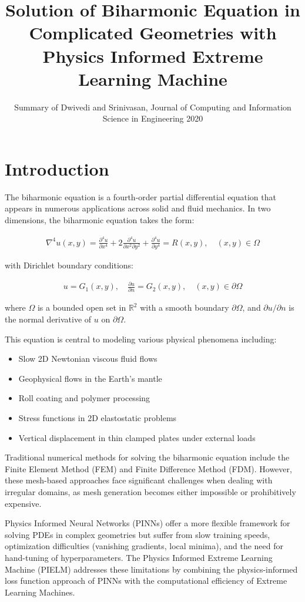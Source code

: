 \documentclass[11pt]{article}
\title{Solution of Biharmonic Equation in Complicated Geometries with Physics Informed Extreme Learning Machine}
\author{Summary of Dwivedi and Srinivasan, Journal of Computing and Information Science in Engineering 2020}
\date{}
\begin{document}
\maketitle

\section{Introduction}

The biharmonic equation is a fourth-order partial differential equation that appears in numerous applications across solid and fluid mechanics. In two dimensions, the biharmonic equation takes the form:

\begin{align}
\nabla^4 u(x,y) = \frac{\partial^4 u}{\partial x^4} + 2\frac{\partial^4 u}{\partial x^2 \partial y^2} + \frac{\partial^4 u}{\partial y^4} = R(x,y), \quad (x,y) \in \Omega
\end{align}

with Dirichlet boundary conditions:

\begin{align}
u = G_1(x,y), \quad \frac{\partial u}{\partial n} = G_2(x,y), \quad (x,y) \in \partial\Omega
\end{align}

where $\Omega$ is a bounded open set in $\mathbb{R}^2$ with a smooth boundary $\partial\Omega$, and $\partial u/\partial n$ is the normal derivative of $u$ on $\partial\Omega$.

This equation is central to modeling various physical phenomena including:
\begin{itemize}
    \item Slow 2D Newtonian viscous fluid flows
    \item Geophysical flows in the Earth's mantle
    \item Roll coating and polymer processing
    \item Stress functions in 2D elastostatic problems
    \item Vertical displacement in thin clamped plates under external loads
\end{itemize}

Traditional numerical methods for solving the biharmonic equation include the Finite Element Method (FEM) and Finite Difference Method (FDM). However, these mesh-based approaches face significant challenges when dealing with irregular domains, as mesh generation becomes either impossible or prohibitively expensive.

Physics Informed Neural Networks (PINNs) offer a more flexible framework for solving PDEs in complex geometries but suffer from slow training speeds, optimization difficulties (vanishing gradients, local minima), and the need for hand-tuning of hyperparameters. The Physics Informed Extreme Learning Machine (PIELM) addresses these limitations by combining the physics-informed loss function approach of PINNs with the computational efficiency of Extreme Learning Machines.
\end{document}
